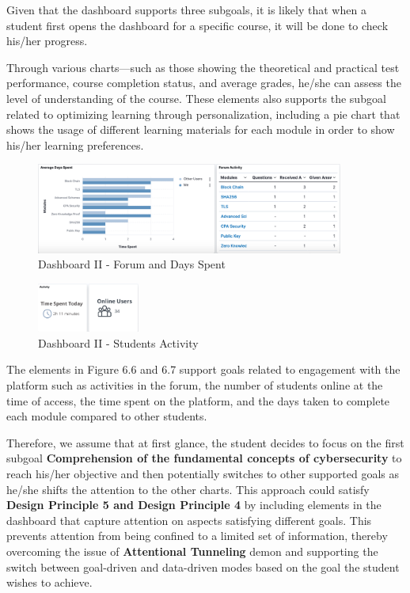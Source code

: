 Given that the dashboard supports three subgoals, it is likely that when a student first opens the dashboard for a specific course, it will be done to check his/her progress. 

Through various charts—such as those showing the theoretical and practical test performance, course completion status, and average grades, he/she can assess the level of understanding of the course. 
These elements also supports the subgoal related to optimizing learning through personalization, including a pie chart that shows the usage of different learning materials for each module in order to show his/her learning preferences. 

\begin{figure}[H]
    \centering
    \includegraphics[width=0.9\textwidth]{assets/forum2.png}
    \caption{Dashboard II - Forum and Days Spent}
    \label{fig:dashboard_2}
\end{figure}

\begin{figure}[H]
    \centering
    \includegraphics[width=0.3\textwidth]{assets/activity2.png}
    \caption{Dashboard II - Students Activity}
    \label{fig:dashboard_2}
\end{figure}

The elements in Figure 6.6 and 6.7 support goals related to engagement with the platform such as activities in the forum, the number of students online at the time of access, the time spent on the platform, and the days taken to complete each module compared to other students.

Therefore, we assume that at first glance, the student decides to focus on the first subgoal \textbf{Comprehension of the fundamental concepts of cybersecurity} to reach his/her objective and then potentially switches to other supported goals as he/she shifts the attention to the other charts. This approach could satisfy \textbf{Design Principle 5 and Design Principle 4} by including elements in the dashboard that capture attention on aspects satisfying different goals. This prevents attention from being confined to a limited set of information, thereby overcoming the issue of \textbf{Attentional Tunneling} demon and supporting the switch between goal-driven and data-driven modes based on the goal the student wishes to achieve.

